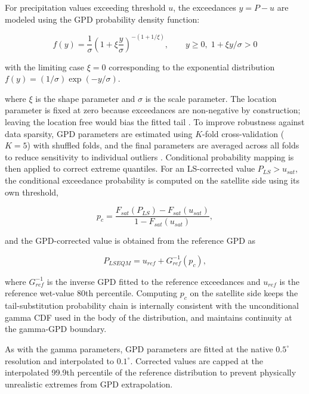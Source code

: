 \documentclass[11pt,a4paper]{article}
\begin{document}
For precipitation values exceeding threshold \(u\), the exceedances
\(y = P - u\) are modeled using the GPD probability density function:

\begin{equation}f(y) = \frac{1}{\sigma} \left( 1 + \xi \frac{y}{\sigma} \right)^{-(1 + 1/\xi)}, \qquad y \geq 0,\; 1 + \xi y/\sigma > 0\end{equation}

with the limiting case \(\xi = 0\) corresponding to the exponential distribution \(f(y) = (1/\sigma) \exp(-y/\sigma)\).

where \(\xi\) is the shape parameter and \(\sigma\) is the scale
parameter. The location parameter is fixed at zero because exceedances
are non-negative by construction; leaving the location free would bias
the fitted tail \cite{ref7}. To improve robustness against data sparsity,
GPD parameters are estimated using \(K\)-fold cross-validation
(\(K = 5\)) with shuffled folds, and the final parameters are averaged
across all folds to reduce sensitivity to individual outliers \cite{ref25}.
Conditional probability mapping is then applied to correct extreme
quantiles. For an LS-corrected value \(P_{LS} > u_{sat}\), the conditional
exceedance probability is computed on the satellite side using its own
threshold,

\begin{equation}p_c = \frac{F_{sat}(P_{LS}) - F_{sat}(u_{sat})}{1 - F_{sat}(u_{sat})},\end{equation}

and the GPD-corrected value is obtained from the reference GPD as

\begin{equation}P_{LSEQM} = u_{ref} + G_{ref}^{-1}(p_c),\end{equation}

where \(G_{ref}^{-1}\) is the inverse GPD fitted to the reference
exceedances and \(u_{ref}\) is the reference wet-value 80th percentile.
Computing \(p_c\) on the satellite side keeps the
tail-substitution probability chain is internally consistent with the
unconditional gamma CDF used in the body of the distribution, and
maintains continuity at the gamma-GPD boundary.

As with the gamma parameters, GPD parameters are fitted at the native \(0.5^{\circ}\) resolution and interpolated to \(0.1^{\circ}\). Corrected values are capped at the interpolated 99.9th percentile of the reference distribution to prevent physically unrealistic extremes from GPD extrapolation.
\end{document}
